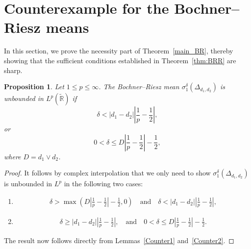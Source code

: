 \documentclass[12pt]{amsart}
\newcommand\R{\mathbb{R}}
\newcommand\Lapd{\Delta_{d_1, d_2}}
\newtheorem{proposition}[theorem]{Proposition}
\begin{document}
\section{Counterexample for the Bochner--Riesz means}\label{BR}

In this section, we prove the necessity part of Theorem~\ref{main_BR}, thereby showing
that the sufficient conditions established in Theorem~\ref{thm:BRR} are sharp.

\begin{proposition}\label{propBRR}
Let $1\le p\le \infty$. The Bochner--Riesz mean $\sigma_{1}^\delta(\Lapd)$ is unbounded in $L^p(\widetilde{\R})$ if
$$
\delta < |d_1-d_2| \left| \frac{1}{p} - \frac{1}{2} \right|,
$$
or
$$
0< \delta \le D \left|\frac{1}{p}-\frac{1}{2}\right|-\frac{1}{2},
$$
where $D=d_1 \vee d_2$.
\end{proposition}

\begin{proof}
It follows by complex interpolation that we only need to show $\sigma_{1}^\delta(\Lapd)$ is unbounded in $L^p$ in the following two cases: 
\begin{enumerate}[label=(\Alph*)]
    \item \begin{align*}
        \delta > \max \left( D\left|\frac{1}{p}-\frac{1}{2}\right|-\frac{1}{2}, 0 \right) \quad \textrm{and} \quad \delta < |d_1-d_2| \left|\frac{1}{p}-\frac{1}{2}\right|,
        \end{align*}
        \item \begin{align*}
            \delta \ge |d_1-d_2| \left|\frac{1}{p}-\frac{1}{2}\right|, \quad \textrm{and}\quad 0<\delta \le D\left|\frac{1}{p}-\frac{1}{2}\right|-\frac{1}{2}.
        \end{align*}
\end{enumerate}
The result now follows directly from Lemmas~\ref{Counter1}
and~\ref{Counter2}.
\end{proof}
\end{document}
